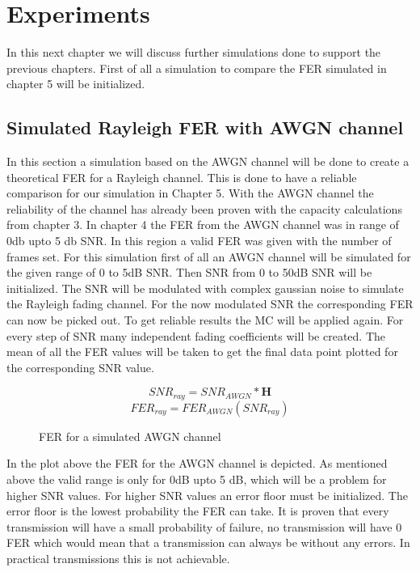 \chapter{Experiments} \label{chap:Experiments}
\graphicspath{{C:/Users/Kevin/Bachelarbeit/Bachelorarbeit/01_Bachelorarbeit_LaTex/02_Figures/}}

In this next chapter we will discuss further simulations done to support the previous chapters. First of all a simulation to compare the \gls{FER} simulated in chapter 5 will be initialized.
\section{Simulated Rayleigh FER with AWGN channel}
\label{RAYAWGN}

In this section a simulation based on the AWGN channel will be done to create a theoretical \gls{FER} for a Rayleigh channel. This is done to have a reliable comparison for our simulation in Chapter 5. 
With the AWGN channel the reliability of the channel has already been proven with the capacity calculations from chapter 3. In chapter 4 the \gls{FER} from the AWGN channel was in range of 0db upto 5 db SNR. In this region a valid \gls{FER} was given with the number of frames set. 
For this simulation first of all an AWGN channel will be simulated for the given range of 0 to 5dB SNR. Then SNR from 0 to 50dB SNR will be initialized. The SNR will be modulated with complex gaussian noise to simulate the Rayleigh fading channel. For the now modulated SNR the corresponding \gls{FER} can now be picked out. To get reliable results the \gls{MC} will be applied again. For every step of SNR many independent fading coefficients will be created. The mean of all the \gls{FER} values will be taken to get the final data point plotted for the corresponding \gls{SNR} value.    

\begin{equation}
SNR_{ray} = SNR_{AWGN} * \textbf{H}
\end{equation}
\begin{equation}
FER_{ray} = FER_{AWGN}(SNR_{ray})
\end{equation}

\begin{figure}[!htb]
	\setlength{}
	\setlength\fheight{0.4\textheight}
    \centering
    
    \caption{FER for a simulated AWGN channel}
    \label{fig:FERAWGN}
\end{figure}
In the plot above the \gls{FER} for the AWGN channel is depicted. As mentioned above the valid range is only for 0dB upto 5 dB, which will be a problem for higher \gls{SNR} values. For higher SNR values an error floor must be initialized. The error floor is the lowest probability the \gls{FER} can take. It is proven that every transmission will have a small probability of failure, no transmission will have 0 \gls{FER} which would mean that a transmission can always be without any errors. In practical transmissions this is not achievable.

